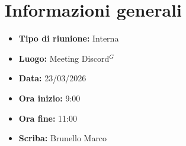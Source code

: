 \section{Informazioni generali}

\begin{itemize}
    \item \textbf{Tipo di riunione:} Interna
    \item \textbf{Luogo:} Meeting Discord$^G$
    \item \textbf{Data:} 23/03/2026
    \item \textbf{Ora inizio:} 9:00
    \item \textbf{Ora fine:} 11:00
    \item \textbf{Scriba:} Brunello Marco
\end{itemize}